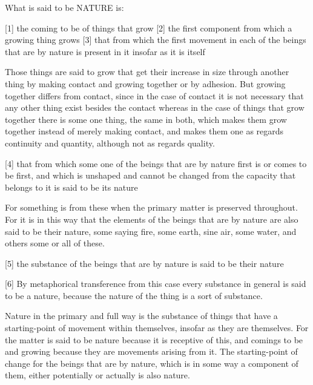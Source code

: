 What is said to be NATURE is:

[1]     the coming to be of things that grow
[2]     the first component from which a growing thing grows
[3]     that from which the first movement in each of the beings
        that are by nature is present in it insofar as it is itself

        Those things are said to grow that get their increase in size
        through another thing by making contact and growing together
        or by adhesion. But growing together differs from contact,
        since in the case of contact it is not necessary that 
        any other thing exist besides the contact whereas in the case of
        things that grow together there is some one thing, the same in both,
        which makes them grow together instead of merely making contact,
        and makes them one as regards continuity and quantity,
        although not as regards quality.

[4]     that from which some one of the beings that are by nature
        first is or comes to be first, and which is unshaped and cannot
        be changed from the capacity that belongs to it is said to
        be its nature

        For something is from these when the primary matter is preserved
        throughout. For it is in this way that the elements of the beings
        that are by nature are also said to be their nature,
        some saying fire, some earth, sine air, some water, and others
        some or all of these.

[5]     the substance of the beings that are by nature is said to be their nature

[6]     By metaphorical transference from this case every substance in general is
        said to be a nature, because the nature of the thing is a sort of substance.

Nature in the primary and full way is the substance of things that
have a starting-point of movement within themselves, insofar as
they are themselves. For the matter is said to be nature
because it is receptive of this, and comings to be and growing because
they are movements arising from it. The starting-point of change for the beings
that are by nature, which is in some way a component of them, either potentially
or actually is also nature.
